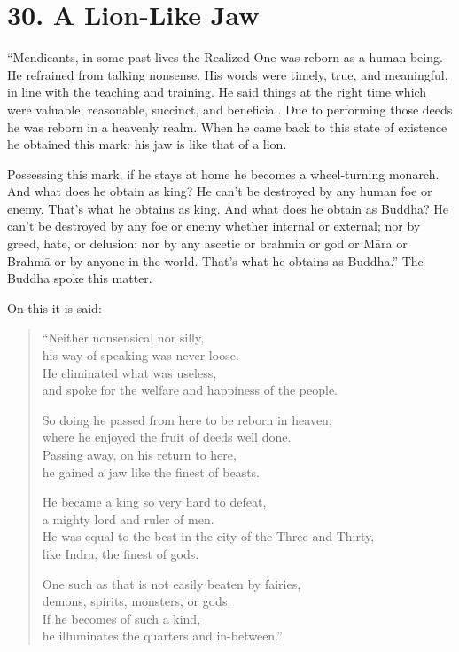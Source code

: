 \documentclass[12pt,openany]{book}%
\begin{document}
\section*{30. A Lion-Like Jaw }

“Mendicants, in some past lives the Realized One was reborn as a human being. He refrained from talking nonsense. His words were timely, true, and meaningful, in line with the teaching and training. He said things at the right time which were valuable, reasonable, succinct, and beneficial. Due to performing those deeds he was reborn in a heavenly realm. When he came back to this state of existence he obtained this mark: his jaw is like that of a lion. 

Possessing this mark, if he stays at home he becomes a wheel-turning monarch. And what does he obtain as king? He can’t be destroyed by any human foe or enemy. That’s what he obtains as king. And what does he obtain as Buddha? He can’t be destroyed by any foe or enemy whether internal or external; nor by greed, hate, or delusion; nor by any ascetic or brahmin or god or \textsanskrit{Māra} or \textsanskrit{Brahmā} or by anyone in the world. That’s what he obtains as Buddha.” The Buddha spoke this matter. 

On this it is said: 

\begin{verse}%
“Neither nonsensical nor silly, \\
his way of speaking was never loose. \\
He eliminated what was useless, \\
and spoke for the welfare and happiness of the people. 

So doing he passed from here to be reborn in heaven, \\
where he enjoyed the fruit of deeds well done. \\
Passing away, on his return to here, \\
he gained a jaw like the finest of beasts. 

He became a king so very hard to defeat, \\
a mighty lord and ruler of men. \\
He was equal to the best in the city of the Three and Thirty, \\
like Indra, the finest of gods. 

One such as that is not easily beaten by fairies, \\
demons, spirits, monsters, or gods. \\
If he becomes of such a kind, \\
he illuminates the quarters and in-between.” 

%
\end{verse}
\end{document}
